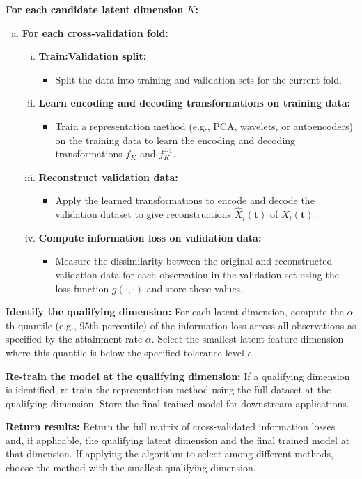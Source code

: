 \begin{algorithm}
\begin{algorithmic}[1]
\State \textbf{For each candidate latent dimension $K$:}
\begin{enumerate}[a.]
    \item \textbf{For each cross-validation fold:}
    \begin{enumerate}[i.]
        \item \textbf{Train:Validation split:} 
        \begin{itemize}
            \item Split the data into training and validation sets for the current fold.
        \end{itemize}
        \item \textbf{Learn encoding and decoding transformations on training data:}
        \begin{itemize}
            \item Train a representation method (e.g., PCA, wavelets, or autoencoders) on the training data to learn the encoding and decoding transformations $f_K$ and $f^{-1}_K$.
        \end{itemize}
        \item \textbf{Reconstruct validation data:}
        \begin{itemize}
            \item Apply the learned transformations to encode and decode the validation dataset to give reconstructions $\widehat{X}_i (\mathbf{t})$ of $X_i (\mathbf{t})$.
        \end{itemize}
        \item \textbf{Compute information loss on validation data:}
        \begin{itemize}
            \item Measure the dissimilarity between the original and reconstructed validation data for each observation in the validation set using the loss function $g(\cdot, \cdot)$ and store these values.
        \end{itemize}
    \end{enumerate}
\end{enumerate}

\State \textbf{Identify the qualifying dimension:} For each latent dimension, compute the $\alpha$th quantile (e.g., 95th percentile) of the information loss across all observations as specified by the attainment rate $\alpha$. Select the smallest latent feature dimension where this quantile is below the specified tolerance level $\epsilon$.

\State \textbf{Re-train the model at the qualifying dimension:} If a qualifying dimension is identified, re-train the representation method using the full dataset at the qualifying dimension. Store the final trained model for downstream applications.

\State \textbf{Return results:} Return the full matrix of cross-validated information losses and, if applicable, the qualifying latent dimension and the final trained model at that dimension. If applying the algorithm to select among different methods, choose the method with the smallest qualifying dimension.

\end{algorithmic}
\end{algorithm}


